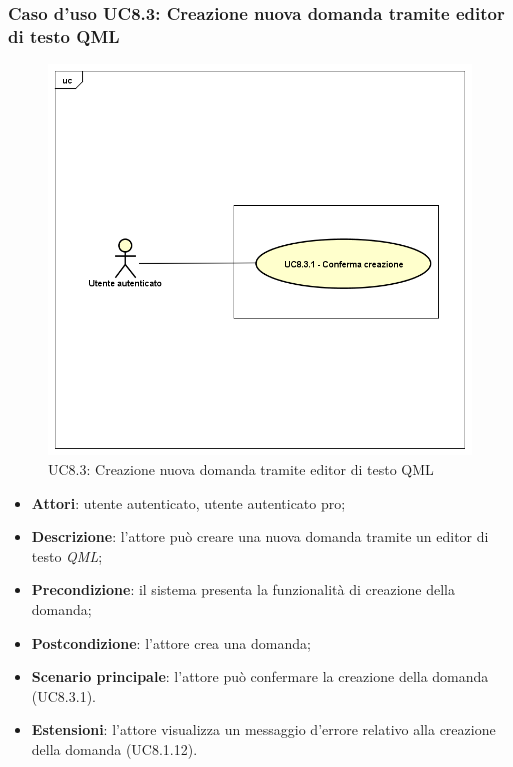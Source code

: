 	\subsubsection{Caso d'uso UC8.3: Creazione nuova domanda tramite editor di testo QML}
	\label{UC8.3}
	\begin{figure}[h]
		\centering
		\includegraphics[scale=0.45,keepaspectratio]{UML/UC8_3.png}
		\caption{UC8.3: Creazione nuova domanda tramite editor di testo QML}
	\end{figure}
	\FloatBarrier
	\begin{itemize}
		\item
		\textbf{Attori}: utente autenticato, utente autenticato pro;
		\item		
		\textbf{Descrizione}: l'attore può creare una nuova domanda tramite un editor di testo \textit{QML};
		\item
		\textbf{Precondizione}: il sistema presenta la funzionalità di creazione della domanda;
		\item
		\textbf{Postcondizione}: l'attore crea una domanda;		
		\item
		\textbf{Scenario principale}: l'attore può confermare la creazione della domanda (UC8.3.1).
		\item
		\textbf{Estensioni}: l'attore visualizza un messaggio d'errore relativo alla creazione della domanda (UC8.1.12).
	\end{itemize}	
	
